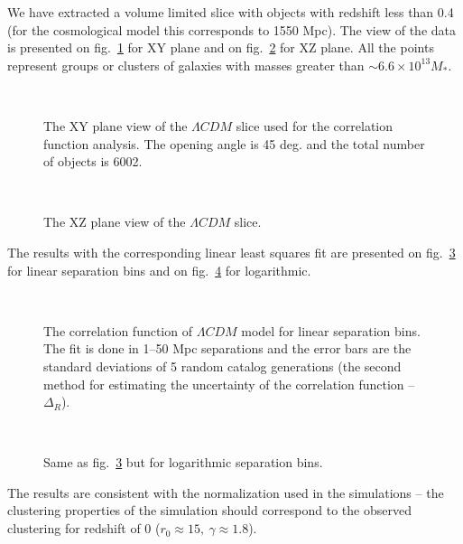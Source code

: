 We have extracted a
volume limited slice with objects with redshift less than 0.4 (for the
cosmological model this corresponds to 1550 Mpc). The view of the data
is presented on fig.~\ref{fig_lcdm1} for XY plane and on
fig.~\ref{fig_lcdm2} for XZ plane. All the points represent groups or
clusters of galaxies with masses greater than $\sim 6.6 \times 10^{13}
M_{*}$.

\begin{figure}[htb]
\centerline{
\hbox{
}}
\caption{The XY plane view of the $\Lambda CDM$ slice used for the
  correlation function analysis. The opening angle is 45 deg. and the
  total number of objects is 6002.}
\label{fig_lcdm1}
\end{figure}

\begin{figure}[htb]
\centerline{
\hbox{
}}
\caption{The XZ plane view of the $\Lambda CDM$ slice.}
\label{fig_lcdm2}
\end{figure}

The results with the corresponding linear least squares fit are
presented on fig.~\ref{lcdm_fig3} for linear separation bins and on
fig.~\ref{lcdm_fig4} for logarithmic.

\begin{figure}[htb]
\centerline{
\hbox{
}}
\caption{The correlation function of $\Lambda CDM$ model for linear
  separation bins. The fit is done in 1--50 Mpc separations and the
  error bars are the standard deviations of 5 random catalog
  generations (the second method for estimating the uncertainty of the 
  correlation function -- $\Delta_R$).}
\label{lcdm_fig3}
\end{figure}

\begin{figure}[htb]
\centerline{
\hbox{
}}
\caption{Same as fig.~\ref{lcdm_fig3} but for logarithmic separation bins.}
\label{lcdm_fig4}
\end{figure}

The results are consistent with the normalization used in the
simulations -- the clustering properties of the simulation should
correspond to the observed clustering for redshift of 0 ($r_0 \approx
15,\ \gamma \approx 1.8$).

